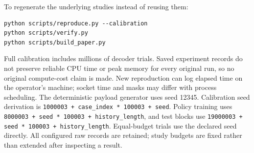 \documentclass[11pt,a4paper]{article}
\begin{document}
To regenerate the underlying studies instead of reusing them:

\begin{verbatim}
python scripts/reproduce.py --calibration
python scripts/verify.py
python scripts/build_paper.py
\end{verbatim}
Full calibration includes millions of decoder trials. Saved experiment records do not preserve reliable CPU time or peak memory for every original run, so no original compute-cost claim is made. New reproduction can log elapsed time on the operator's machine; socket time and masks may differ with process scheduling. The deterministic payload generator uses seed 12345. Calibration seed derivation is \texttt{1000003 + case\_\allowbreak{}index * 100003 + seed}. Policy training uses \texttt{8000003 + seed * 100003 + history\_\allowbreak{}length}, and test blocks use \texttt{19000003 + seed * 100003 + history\_\allowbreak{}length}. Equal-budget trials use the declared seed directly. All configured raw records are retained; study budgets are fixed rather than extended after inspecting a result.
\end{document}
